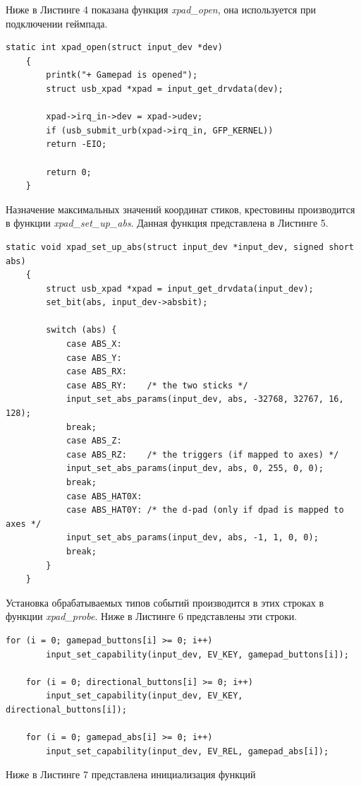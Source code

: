 Ниже в Листинге 4 показана функция \textit{xpad\_open}, она используется при подключении геймпада.
 \begin{lstlisting}[caption=Функция xpad\_open]
 	static int xpad_open(struct input_dev *dev)
 	{
 		printk("+ Gamepad is opened");
 		struct usb_xpad *xpad = input_get_drvdata(dev);
 		
 		xpad->irq_in->dev = xpad->udev;
 		if (usb_submit_urb(xpad->irq_in, GFP_KERNEL))
 		return -EIO;
 		
 		return 0;
 	}
 \end{lstlisting}

Назначение максимальных значений координат стиков, крестовины производится в функции \textit{xpad\_set\_up\_abs}. 
Данная функция представлена в Листинге 5.
\begin{lstlisting}[caption=Функция xpad\_set\_up\_abs]
	static void xpad_set_up_abs(struct input_dev *input_dev, signed short abs)
	{
		struct usb_xpad *xpad = input_get_drvdata(input_dev);
		set_bit(abs, input_dev->absbit);
		
		switch (abs) {
			case ABS_X:
			case ABS_Y:
			case ABS_RX:
			case ABS_RY:	/* the two sticks */
			input_set_abs_params(input_dev, abs, -32768, 32767, 16, 128);
			break;
			case ABS_Z:
			case ABS_RZ:	/* the triggers (if mapped to axes) */
			input_set_abs_params(input_dev, abs, 0, 255, 0, 0);
			break;
			case ABS_HAT0X:
			case ABS_HAT0Y:	/* the d-pad (only if dpad is mapped to axes */
			input_set_abs_params(input_dev, abs, -1, 1, 0, 0);
			break;
		}
	}
\end{lstlisting}

Установка обрабатываемых типов событий производится в этих строках в функции \textit{xpad\_probe}.
Ниже в Листинге 6 представлены эти строки.
 \begin{lstlisting}[caption=Установка обрабатываемых типов событий]
	for (i = 0; gamepad_buttons[i] >= 0; i++)
		input_set_capability(input_dev, EV_KEY, gamepad_buttons[i]);
	
	for (i = 0; directional_buttons[i] >= 0; i++)
		input_set_capability(input_dev, EV_KEY, directional_buttons[i]);
	
	for (i = 0; gamepad_abs[i] >= 0; i++)
		input_set_capability(input_dev, EV_REL, gamepad_abs[i]);
\end{lstlisting}

Ниже в Листинге 7 представлена инициализация функций

